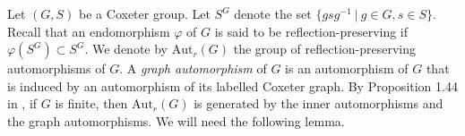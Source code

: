 \documentclass[a4paper, 11pt]{amsart}
\theoremstyle{definition}
\theoremstyle{remark}
\renewcommand{\geq}{\geqslant}
\begin{document}

Let $(G,S)$ be a Coxeter group. Let $S^G$ denote the set $\lbrace gsg^{-1} \ \vert \ g\in G, s\in S\rbrace$. Recall that an endomorphism $\varphi$ of $G$ is said to be reflection-preserving if $\varphi(S^G)\subset S^G$. We denote by $\mathrm{Aut}_r(G)$ the group of reflection-preserving automorphisms of $G$. A \emph{graph automorphism} of $G$ is an automorphism of $G$ that is induced by an automorphism of its labelled Coxeter graph. By Proposition 1.44 in \cite{franz}, if $G$ is finite, then $\mathrm{Aut}_r(G)$ is generated by the inner automorphisms and the graph automorphisms. We will need the following lemma.
\end{document}
